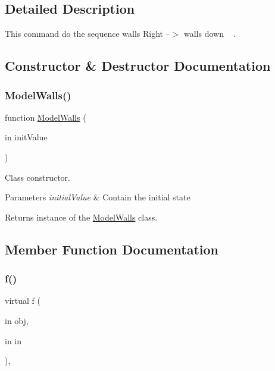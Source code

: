 \subsection{Detailed Description}
This command do the sequence walls Right --$>$ walls down ~\newline
. 

\subsection{Constructor \& Destructor Documentation}
\mbox{\label{class_model_walls_a5aa5cfd2186c06e8ab37ce531b1a9720}} 
\subsubsection{\texorpdfstring{Model\+Walls()}{ModelWalls()}}
{\footnotesize\ttfamily function \hyperlink{class_model_walls}{Model\+Walls} (\begin{DoxyParamCaption}\item[{in}]{init\+Value }\end{DoxyParamCaption})}



Class constructor. 


\begin{DoxyParams}{Parameters}
{\em initial\+Value} & Contain the initial state \\
\hline
\end{DoxyParams}
\begin{DoxyReturn}{Returns}
instance of the \hyperlink{class_model_walls}{Model\+Walls} class. 
\end{DoxyReturn}


\subsection{Member Function Documentation}
\mbox{\label{class_model_s_e_d_ac36f9451c43b120828af4380858f2024}} 
\subsubsection{\texorpdfstring{f()}{f()}\hspace{0.1cm}{\footnotesize\ttfamily [1/2]}}
{\footnotesize\ttfamily virtual f (\begin{DoxyParamCaption}\item[{in}]{obj,  }\item[{in}]{in }\end{DoxyParamCaption})\hspace{0.3cm}{\ttfamily [virtual]}, {\ttfamily [inherited]}}



